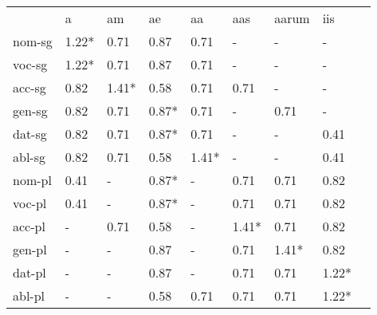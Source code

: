 \documentclass{article}
\begin{document}
\begin{tabular}{lllllllll}\toprule
                  &a       &am      &ae      &aa      &aas     &aarum   &iis     \\ 
nom-sg         & 1.22*  &  0.71  &  0.87  &  0.71  &    -   &    -   &    -   \\ 
voc-sg         & 1.22*  &  0.71  &  0.87  &  0.71  &    -   &    -   &    -   \\ 
acc-sg         &  0.82  & 1.41*  &  0.58  &  0.71  &  0.71  &    -   &    -   \\ 
gen-sg         &  0.82  &  0.71  & 0.87*  &  0.71  &    -   &  0.71  &    -   \\ 
dat-sg         &  0.82  &  0.71  & 0.87*  &  0.71  &    -   &    -   &  0.41  \\ 
abl-sg         &  0.82  &  0.71  &  0.58  & 1.41*  &    -   &    -   &  0.41  \\ 
nom-pl         &  0.41  &    -   & 0.87*  &    -   &  0.71  &  0.71  &  0.82  \\ 
voc-pl         &  0.41  &    -   & 0.87*  &    -   &  0.71  &  0.71  &  0.82  \\ 
acc-pl         &    -   &  0.71  &  0.58  &    -   & 1.41*  &  0.71  &  0.82  \\ 
gen-pl         &    -   &    -   &  0.87  &    -   &  0.71  & 1.41*  &  0.82  \\ 
dat-pl         &    -   &    -   &  0.87  &    -   &  0.71  &  0.71  & 1.22*  \\ 
abl-pl         &    -   &    -   &  0.58  &  0.71  &  0.71  &  0.71  & 1.22*  \\ 
\end{tabular}

 \vspace{0.2in}
\end{document}
